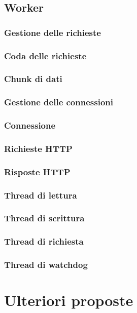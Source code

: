 \documentclass[italian]{tktltiki2}
\begin{document}
\subsection{Worker}
\subsubsection{Gestione delle richieste}
\subsubsection*{Coda delle richieste}
\subsubsection*{Chunk di dati}
\subsubsection{Gestione delle connessioni}
\subsubsection*{Connessione}
\subsubsection*{Richieste HTTP}
\subsubsection*{Risposte HTTP}
\subsubsection{Thread di lettura}
\subsubsection{Thread di scrittura}
\subsubsection{Thread di richiesta}
\subsubsection{Thread di watchdog}

\newpage
\section{Ulteriori proposte}
\end{document}
